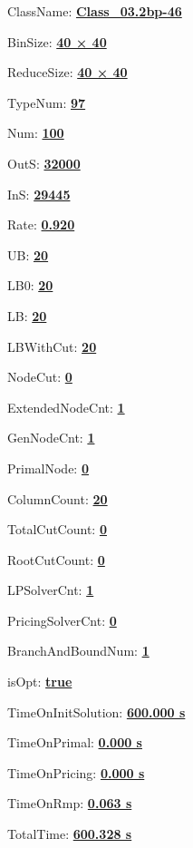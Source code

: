 \documentclass[11pt]{article}
\begin{document}
\pagestyle{empty}


ClassName: \underline{\textbf{Class_03.2bp-46}}
\par
BinSize: \underline{\textbf{40 × 40}}
\par
ReduceSize: \underline{\textbf{40 × 40}}
\par
TypeNum: \underline{\textbf{97}}
\par
Num: \underline{\textbf{100}}
\par
OutS: \underline{\textbf{32000}}
\par
InS: \underline{\textbf{29445}}
\par
Rate: \underline{\textbf{0.920}}
\par
UB: \underline{\textbf{20}}
\par
LB0: \underline{\textbf{20}}
\par
LB: \underline{\textbf{20}}
\par
LBWithCut: \underline{\textbf{20}}
\par
NodeCut: \underline{\textbf{0}}
\par
ExtendedNodeCnt: \underline{\textbf{1}}
\par
GenNodeCnt: \underline{\textbf{1}}
\par
PrimalNode: \underline{\textbf{0}}
\par
ColumnCount: \underline{\textbf{20}}
\par
TotalCutCount: \underline{\textbf{0}}
\par
RootCutCount: \underline{\textbf{0}}
\par
LPSolverCnt: \underline{\textbf{1}}
\par
PricingSolverCnt: \underline{\textbf{0}}
\par
BranchAndBoundNum: \underline{\textbf{1}}
\par
isOpt: \underline{\textbf{true}}
\par
TimeOnInitSolution: \underline{\textbf{600.000 s}}
\par
TimeOnPrimal: \underline{\textbf{0.000 s}}
\par
TimeOnPricing: \underline{\textbf{0.000 s}}
\par
TimeOnRmp: \underline{\textbf{0.063 s}}
\par
TotalTime: \underline{\textbf{600.328 s}}
\par
\newpage


\end{document}
